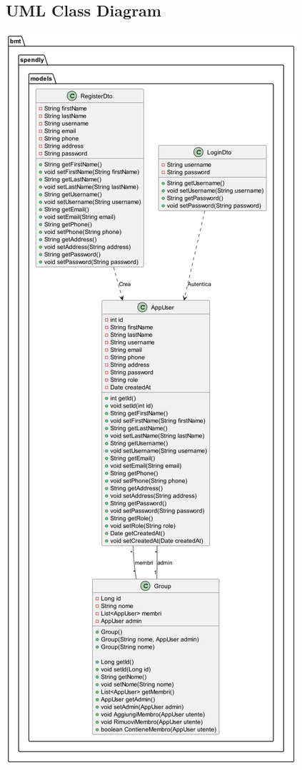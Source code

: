 \subsection{UML Class Diagram }

\begin{center}
    \includegraphics[scale=0.15]{images/ClassDiagram.png}
\end{center}
